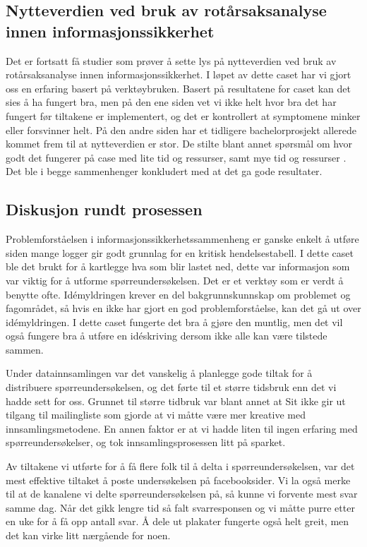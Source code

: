 \subsection{Nytteverdien ved bruk av rotårsaksanalyse innen informasjonssikkerhet}
Det er fortsatt få studier som prøver å sette lys på nytteverdien ved bruk av rotårsaksanalyse innen informasjonssikkerhet. I løpet av dette caset har vi gjort oss en erfaring basert på verktøybruken. Basert på resultatene for caset kan det sies å ha fungert bra, men på den ene siden vet vi ikke helt hvor bra det har fungert før tiltakene er implementert, og det er kontrollert at symptomene minker eller forsvinner helt. På den andre siden har et tidligere bachelorprosjekt allerede kommet frem til at nytteverdien er stor. De stilte blant annet spørsmål om hvor godt det fungerer på case med lite tid og ressurser, samt mye tid og ressurser \cite{RCARapport}. Det ble i begge sammenhenger konkludert med at det ga gode resultater. 

\subsection{Diskusjon rundt prosessen}
Problemforståelsen i informasjonssikkerhetssammenheng er ganske enkelt å utføre siden mange logger gir godt grunnlag for en kritisk hendelsestabell. I dette caset ble det brukt for å kartlegge hva som blir lastet ned, dette var informasjon som var viktig for å utforme spørreundersøkelsen. Det er et verktøy som er verdt å benytte ofte. Idémyldringen krever en del bakgrunnskunnskap om problemet og fagområdet, så hvis en ikke har gjort en god problemforståelse, kan det gå ut over idémyldringen. I dette caset fungerte det bra å gjøre den muntlig, men det vil også fungere bra å utføre en idéskriving dersom ikke alle kan være tilstede sammen. 

Under datainnsamlingen var det vanskelig å planlegge gode tiltak for å distribuere spørreundersøkelsen, og det førte til et større tidsbruk enn det vi hadde sett for oss. Grunnet til større tidbruk var blant annet at Sit ikke gir ut tilgang til mailingliste som gjorde at vi måtte være mer kreative med innsamlingsmetodene. En annen faktor er at vi hadde liten til ingen erfaring med spørreundersøkelser, og tok innsamlingsprosessen litt på sparket. 

Av tiltakene vi utførte for å få flere folk til å delta i spørreundersøkelsen, var det mest effektive tiltaket å poste undersøkelsen på facebooksider. Vi la også merke til at de kanalene vi delte spørreundersøkelsen på, så kunne vi forvente mest svar samme dag. Når det gikk lengre tid så falt svarresponsen og vi måtte purre etter en uke for å få opp antall svar. Å dele ut plakater fungerte også helt greit, men det kan virke litt nærgående for noen. 

